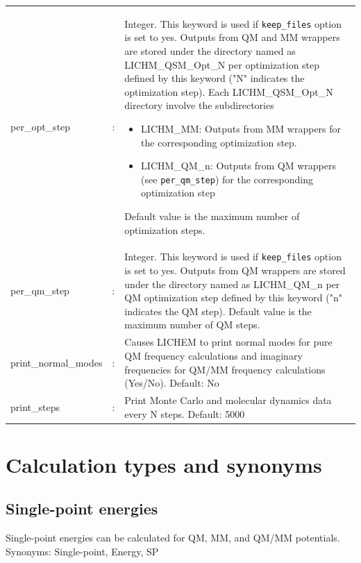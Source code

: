 \documentclass[12pt]{report}
\begin{document}
\begin{center}
\begin{longtable}[c]{ p{4cm} c p{12.5cm}}
per\_opt\_step & : &
Integer.
This keyword is used if \texttt{keep\_files}
option is set to
yes.
Outputs from QM and MM wrappers
are stored under the directory named as
LICHM\_QSM\_Opt\_N  per
optimization step defined by this keyword
("N" indicates the optimization step).
Each LICHM\_QSM\_Opt\_N directory
involve the subdirectories
\begin{itemize}
\item LICHM\_MM: Outputs from MM wrappers
for the corresponding optimization step.
\item  LICHM\_QM\_n: Outputs from
QM wrappers (see \texttt{per\_qm\_step})
for the corresponding optimization step
\end{itemize}
Default value is the maximum number of optimization
steps. \newline \\

per\_qm\_step & : &
Integer.
This keyword is used if \texttt{keep\_files}
option is set to
yes. Outputs from QM wrappers
are stored under the directory named as
LICHM\_QM\_n  per
QM optimization step defined by this keyword
("n" indicates the QM step).
Default value is the maximum number of QM
steps.\newline \\

print\_normal\_modes & : & Causes LICHEM to print normal modes for pure QM
frequency calculations and imaginary frequencies for QM/MM frequency
calculations (Yes/No).
Default: No \newline\\

print\_steps & : & Print Monte Carlo and molecular dynamics data every N steps.
Default: 5000 \\
\end{longtable}
\end{center}
\section{Calculation types and synonyms}
\label{sec:CalcTyp}

\subsection{Single-point energies}

Single-point energies can be calculated for QM, MM, and QM/MM potentials.
Synonyms: Single-point, Energy, SP
\end{document}
